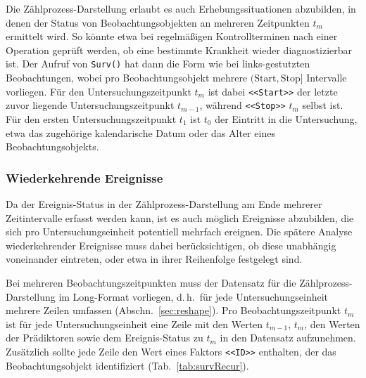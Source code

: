 Die Zählprozess-Darstellung erlaubt es auch Erhebungssituationen abzubilden, in denen der Status von Beobachtungsobjekten
an mehreren Zeitpunkten $t_{m}$ ermittelt wird. So könnte etwa bei regelmäßigen Kontrollterminen nach einer Operation geprüft werden, ob eine bestimmte Krankheit wieder diagnostizierbar ist. Der Aufruf von \lstinline!Surv()! hat dann die Form wie bei links-gestutzten Beobachtungen, wobei pro Beobachtungsobjekt mehrere $(\text{Start}, \text{Stop}]$ Intervalle vorliegen. Für den Untersuchungszeitpunkt $t_{m}$ ist dabei \lstinline!<<Start>>! der letzte zuvor liegende Untersuchungszeitpunkt $t_{m-1}$, während \lstinline!<<Stop>>! $t_{m}$ selbst ist. Für den ersten Untersuchungszeitpunkt $t_{1}$ ist $t_{0}$ der Eintritt in die Untersuchung, etwa das zugehörige kalendarische Datum oder das Alter eines Beobachtungsobjekts.

\subsubsection{Wiederkehrende Ereignisse}

Da der Ereignis-Status in der Zählprozess-Darstellung am Ende mehrerer Zeitintervalle erfasst werden kann, ist es auch möglich Ereignisse abzubilden, die sich pro Untersuchungseinheit potentiell mehrfach ereignen. Die spätere Analyse wiederkehrender Ereignisse muss dabei berücksichtigen, ob diese unabhängig voneinander eintreten, oder etwa in ihrer Reihenfolge festgelegt sind.

Bei mehreren Beobachtungszeitpunkten muss der Datensatz für die Zählprozess-Darstellung im Long-Format vorliegen, d.\,h.\ für jede Untersuchungseinheit mehrere Zeilen umfassen (Abschn.\ \ref{sec:reshape}). Pro Beobachtungszeitpunkt $t_{m}$ ist für jede Untersuchungseinheit eine Zeile mit den Werten $t_{m-1}$, $t_{m}$, den Werten der Prädiktoren sowie dem Ereignis-Status zu $t_{m}$ in den Datensatz aufzunehmen. Zusätzlich sollte jede Zeile den Wert eines Faktors \lstinline!<<ID>>! enthalten, der das Beobachtungsobjekt identifiziert (Tab.\ \ref{tab:survRecur}).

